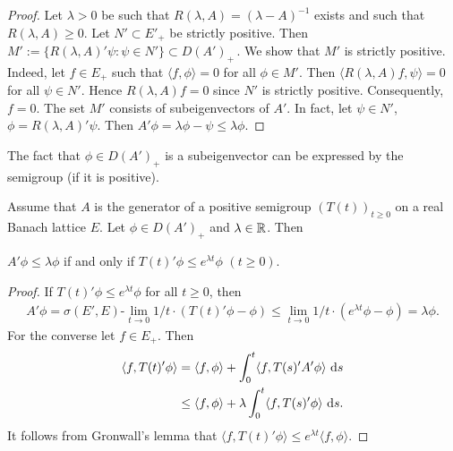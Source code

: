 \begin{proof}
Let $\lambda > 0$ be such that $R(\lambda,A) = (\lambda - A)^{-1}$ exists and such that $R(\lambda,A) \geq 0$.
Let $N' \subset E'_{+}$ be strictly positive.
Then $M' := \{R(\lambda,A)'\psi : \psi \in N'\} \subset D(A')_{+}$\,.
We show that $M'$ is strictly positive.
Indeed, let $f \in E_{+}$ such that $\langle f,\phi \rangle = 0$ for all $\phi \in M'$.
Then $\langle R(\lambda,A)f,\psi \rangle = 0$ for all $\psi \in N'$.
Hence $R(\lambda,A)f = 0$ since $N'$ is strictly positive.
Consequently, $f = 0$.
The set $M'$ consists of
subeigenvectors of $A'$. In fact, let $\psi \in N'$, $\phi = R(\lambda,A)'\psi$. Then
$A'\phi = \lambda\phi - \psi \leq \lambda\phi$.
\end{proof}

The fact that $\phi \in D(A')_{+}$ is a subeigenvector can be expressed by the
semigroup (if it is positive).

\begin{proposition}\label{prop:c2-3.6}
Assume that $A$ is the generator of a positive semigroup $(T(t))_{t \geq 0}$ on a real Banach lattice $E$. Let $\phi \in D(A')_{+}$ and
$\lambda \in \mathbb{R}$. Then

$A'\phi \leq \lambda \phi$ if and only if $T(t)'\phi \leq e^{\lambda t}\phi$ $(t \geq 0)$.
\end{proposition}

\begin{proof}
If $T(t)'\phi \leq e^{\lambda t} \phi$ for all $t \geq 0$, then
\begin{align*}
A'\phi = \sigma(E',E)\text{-}\lim_{t \to 0} 1/t \cdot (T(t)'\phi - \phi) \leq \lim_{t \to 0} 1/t \cdot (e^{\lambda t}\phi - \phi) = \lambda\phi.
\end{align*}
For the converse let $f \in E_{+}$. Then
\begin{align*}
\langle f,T(t)'\phi \rangle &= \langle f,\phi \rangle + \int_{0}^{t} \langle f,T(s)'A'\phi \rangle \, \mathop{}\!\mathrm{d}{s}\\
&\leq \langle f,\phi \rangle + \lambda \int_{0}^{t} \langle f,T(s)'\phi \rangle \, \mathop{}\!\mathrm{d}{s}.
\end{align*}
It follows from Gronwall's lemma that $\langle f,T(t)'\phi \rangle \leq e^{\lambda t} \langle f,\phi \rangle$.
\end{proof}

